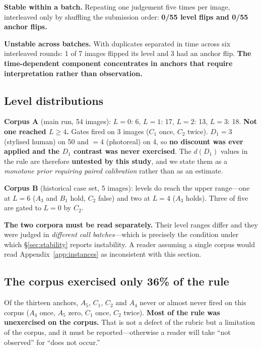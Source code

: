 \documentclass[11pt]{article}
\begin{document}
\textbf{Stable within a batch.} Repeating one judgement five times per image,
interleaved only by shuffling the submission order: \textbf{0/55 level flips
and 0/55 anchor flips.}

\textbf{Unstable across batches.} With duplicates separated in time across six
interleaved rounds: 1 of 7 images flipped its level and 3 had an anchor flip.
\textbf{The time-dependent component concentrates in anchors that require
interpretation rather than observation.}

\subsection{Level distributions}
\label{sec:dist}

\textbf{Corpus A} (main run, 54 images): $L{=}0$: 6, $L{=}1$: 17, $L{=}2$: 13,
$L{=}3$: 18. \textbf{Not one reached $L\ge4$.} Gates fired on 3 images ($C_1$
once, $C_2$ twice). $D_1=3$ (stylised human) on 50 and $=4$ (photoreal) on 4,
so \textbf{no discount was ever applied and the $D_1$ contrast was never
exercised}. The $d(D_1)$ values in the rule are therefore \textbf{untested by
this study}, and we state them as a \emph{monotone prior requiring paired
calibration} rather than as an estimate.

\textbf{Corpus B} (historical case set, 5 images): levels do reach the upper
range---one at $L=6$ ($A_3$ and $B_1$ hold, $C_2$ false) and two at $L=4$
($A_3$ holds). Three of five are gated to $L=0$ by $C_2$.

\textbf{The two corpora must be read separately.} Their level ranges differ and
they were judged in \emph{different call batches}---which is precisely the
condition under which \S\ref{sec:stability} reports instability. A reader
assuming a single corpus would read Appendix~\ref{app:instances} as
inconsistent with this section.

\subsection{The corpus exercised only 36\% of the rule}
\label{sec:attendance}

Of the thirteen anchors, $A_5$, $C_1$, $C_2$ and $A_4$ never or almost never
fired on this corpus ($A_4$ once, $A_5$ zero, $C_1$ once, $C_2$ twice).
\textbf{Most of the rule was unexercised on the corpus.} That is not a defect
of the rubric but a limitation of the corpus, and it must be reported---otherwise
a reader will take ``not observed'' for ``does not occur.''
\end{document}
